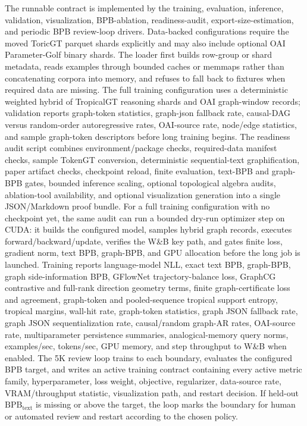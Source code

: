 \documentclass[11pt]{article}
\begin{document}
The runnable contract is implemented by the training, evaluation, inference, validation, visualization, BPB-ablation, readiness-audit, export-size-estimation, and periodic BPB review-loop drivers.  Data-backed configurations require the moved ToricGT parquet shards explicitly and may also include optional OAI Parameter-Golf binary shards.  The loader first builds row-group or shard metadata, reads examples through bounded caches or memmaps rather than concatenating corpora into memory, and refuses to fall back to fixtures when required data are missing.  The full training configuration uses a deterministic weighted hybrid of TropicalGT reasoning shards and OAI graph-window records; validation reports graph-token statistics, graph-json fallback rate, causal-DAG versus random-order autoregressive rates, OAI-source rate, node/edge statistics, and sample graph-token descriptors before long training begins.  The readiness audit script combines environment/package checks, required-data manifest checks, sample TokenGT conversion, deterministic sequential-text graphification, paper artifact checks, checkpoint reload, finite evaluation, text-BPB and graph-BPB gates, bounded inference scaling, optional topological algebra audits, ablation-tool availability, and optional visualization generation into a single JSON/Markdown proof bundle.  For a full training configuration with no checkpoint yet, the same audit can run a bounded dry-run optimizer step on CUDA: it builds the configured model, samples hybrid graph records, executes forward/backward/update, verifies the W\&B key path, and gates finite loss, gradient norm, text BPB, graph-BPB, and GPU allocation before the long job is launched.  Training reports language-model NLL, exact text BPB, graph-BPB, graph side-information BPB, GFlowNet trajectory-balance loss, GraphCG contrastive and full-rank direction geometry terms, finite graph-certificate loss and agreement, graph-token and pooled-sequence tropical support entropy, tropical margins, wall-hit rate, graph-token statistics, graph JSON fallback rate, graph JSON sequentialization rate, causal/random graph-AR rates, OAI-source rate, multiparameter persistence summaries, analogical-memory query norms, examples/sec, tokens/sec, GPU memory, and step throughput to W\&B when enabled.  The 5K review loop trains to each boundary, evaluates the configured BPB target, and writes an active training contract containing every active metric family, hyperparameter, loss weight, objective, regularizer, data-source rate, VRAM/throughput statistic, visualization path, and restart decision.  If held-out \(\mathrm{BPB}_{\mathrm{text}}\) is missing or above the target, the loop marks the boundary for human or automated review and restart according to the chosen policy.
\end{document}
